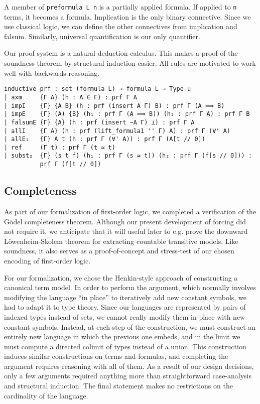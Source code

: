 \documentclass[a4paper,USenglish,cleveref, autoref]{lipics-v2019}
\newcommand{\lil}{\lstinline}
\theoremstyle{definition}
\begin{document}
A member of \lil{preformula L n} is a partially applied formula. If applied to \lil{n} terms, it becomes a formula. Implication is the only binary connective. Since we use classical logic, we can define the other connectives from implication and falsum. Similarly, universal quantification is our only quantifier.

Our proof system is a natural deduction calculus. This makes a proof of the soundness theorem by structural induction easier. All rules are motivated to work well with backwards-reasoning.

\begin{lstlisting}
inductive prf : set (formula L) → formula L → Type u
| axm     {Γ A} (h : A ∈ Γ) : prf Γ A
| impI    {Γ} {A B} (h : prf (insert A Γ) B) : prf Γ (A ⟹ B)
| impE    {Γ} (A) {B} (h₁ : prf Γ (A ⟹ B)) (h₂ : prf Γ A) : prf Γ B
| falsumE {Γ} {A} (h : prf (insert ∼A Γ) ⊥) : prf Γ A
| allI    {Γ A} (h : prf (lift_formula1 '' Γ) A) : prf Γ (∀' A)
| allE₂   {Γ} A t (h : prf Γ (∀' A)) : prf Γ (A[t // 0])
| ref     (Γ t) : prf Γ (t ≃ t)
| subst₂  {Γ} (s t f) (h₁ : prf Γ (s ≃ t)) (h₂ : prf Γ (f[s // 0])) :
          prf Γ (f[t // 0])
\end{lstlisting}

\subsection{Completeness}
As part of our formalization of first-order logic, we completed a verification of the G\"odel completeness theorem. Although our present development of forcing did not require it, we anticipate that it will useful later to e.g. prove the downward L\"owenheim-Skolem theorem for extracting countable transitive models. Like soundness, it also serves as a proof-of-concept and stress-test of our chosen encoding of first-order logic.

For our formalization, we chose the Henkin-style approach of constructing a canonical term model. In order to perform the argument, which normally involves modifying the language ``in place'' to iteratively add new constant symbols, we had to adapt it to type theory. Since our languages are represented by pairs of indexed types instead of sets, we cannot really modify them in-place with new constant symbols. Instead, at each step of the construction, we must construct an entirely new language in which the previous one embeds, and in the limit we must compute a directed colimit of types instead of a union. This construction induces similar constructions on terms and formulas, and completing the argument requires reasoning with all of them. As a result of our design decisions, only a few arguments required anything more than straightforward case-analysis and structural induction. The final statement makes no restrictions on the cardinality of the language.
\end{document}
